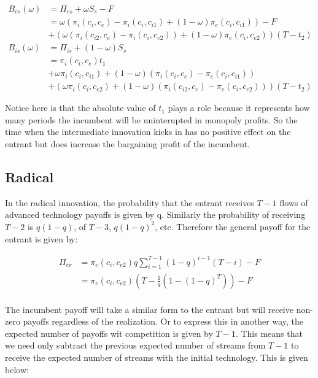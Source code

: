 \begin{align*}
B_{es}(\omega) &= \Pi_{es}+ \omega S_s -F \\
&=\omega(\pi_i(c_i,c_{e})-\pi_i(c_i,c_{i1})+(1-\omega)\pi_e(c_i,c_{i1}))-F \\
&+(\omega(\pi_i(c_{i2},c_e)- \pi_i(c_{i},c_{e2}))+(1-\omega)\pi_e(c_{i},c_{e2}))(T-t_2) \\
B_{is}(\omega) &= \Pi_{is}+(1-\omega)S_s \\
& =\pi_i(c_i,c_{e})t_1 \\
&+\omega \pi_i(c_i,c_{i1})+(1-\omega)(\pi_i(c_i,c_{e})-\pi_e(c_i,c_{i1}))
\\&+(\omega \pi_i(c_i,c_{e2})+(1-\omega)(\pi_i(c_{i2},c_e)-\pi_e(c_{i},c_{e2})))(T-t_2)
\end{align*}

Notice here is that the absolute value of $t_1$ plays a role because it represents how many periods the incumbent will be uninterupted in monopoly profits. So the time when the intermediate innovation kicks in has no positive effect on the entrant but does increase the bargaining profit of the incumbent. 

\subsection{Radical}

In the radical innovation, the probability that the entrant receives $T-1$ flows of advanced technology payoffs is given by q. Similarly the probability of receiving $T-2$ is $q(1-q)$, of $T-3$, $q(1-q)^2$, etc. Therefore the general payoff for the entrant is given by:

\begin{align*}
\Pi_{er} & = 
\pi_{e}(c_i,c_{e2}) q \sum_{i=1}^{T-1} (1-q)^{i-1} (T-i) -F \\
&= \pi_{e}(c_i,c_{e2}) \left( T- \frac{1}{q} \left( 1-(1-q)^{T} \right) \right) -F \\
\end{align*}

The incumbent payoff will take a similar form to the entrant but will receive non-zero payoffs regardless of the realization. Or to express this in another way, the expected number of payoffs wit competition is given by $T-1$. This means that we need only subtract the previous expected number of streams from $T-1$ to receive the expected number of streams with the initial technology. This is given below: 

